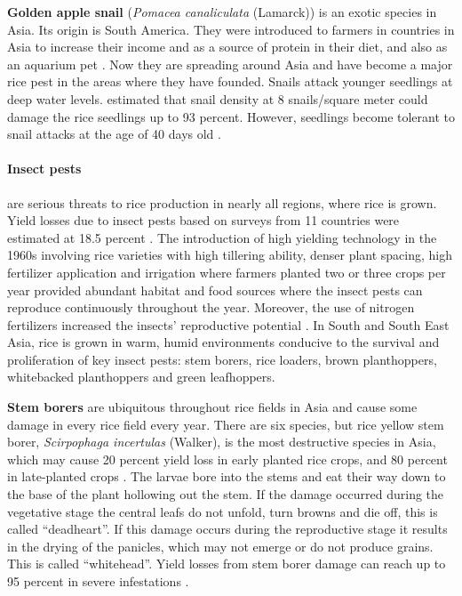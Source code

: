 \textbf{Golden apple snail} (\textit{Pomacea canaliculata} (Lamarck)) is an exotic species in Asia. Its origin is South America. They were introduced to farmers in countries in Asia to increase their income and as a source of protein in their diet, and also as an aquarium pet \citep{Joshi_2007_Problems}.  Now they are spreading around Asia and have become a major rice pest in the areas where they have founded. Snails attack younger seedlings at deep water levels. \citep{Basilio_1991_Problems} estimated that snail density at 8 snails/square meter could damage the rice seedlings up to 93 percent. However, seedlings become tolerant to snail attacks at the age of 40 days old \citep{Sin_2003_Damage}.  


\paragraph{Insect pests} are serious threats to rice production in nearly all regions, where rice is grown. Yield losses due to insect pests based on surveys from 11 countries were estimated at 18.5 percent \citep{Pathak_1994_Insect}.  The introduction of high yielding technology in the 1960s involving rice varieties with high tillering ability, denser plant spacing, high fertilizer application and irrigation where farmers planted two or three crops per year provided abundant habitat and food sources where the insect pests can reproduce continuously throughout the year. Moreover, the use of nitrogen fertilizers increased the insects' reproductive potential \citep{Bottrell_2012_Resurrecting}. In South and South East Asia, rice is grown in warm, humid environments conducive to the survival and proliferation of key insect pests: stem borers, rice loaders, brown planthoppers, whitebacked planthoppers and green leafhoppers.

\textbf{Stem borers} are ubiquitous throughout rice fields in Asia and cause some damage in every rice field every year. There are six species, but rice yellow stem borer, \textit{Scirpophaga incertulas} (Walker), is the most destructive species in Asia, which may cause 20 percent yield loss in early planted rice crops, and 80 percent in late-planted crops \cite{Ooi_1994_Predators}. The larvae bore into the stems and eat their way down to the base of the plant hollowing out the stem. If the damage occurred during the vegetative stage the central leafs do not unfold, turn browns and die off, this is called ``deadheart''. If this damage occurs during the reproductive stage it results in the drying of the panicles, which may not emerge or do not produce grains. This is called ``whitehead''. Yield losses from stem borer damage can reach up to 95 percent in severe infestations \cite{Pathak_1994_Insect}.

